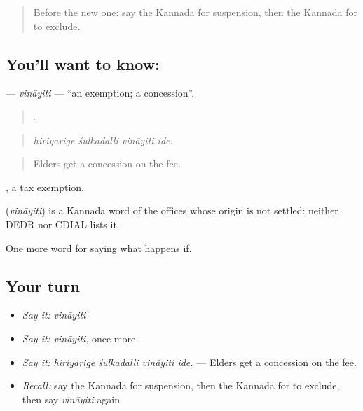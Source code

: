 \label{lesson:KA-C415-vinayiti}



\begin{quote}
Before the new one: say the Kannada for suspension, then the Kannada for to exclude.
\end{quote}

\subsection*{You'll want to know: }
\textbf{} — \emph{vināyiti} — \textquotedblleft{}an exemption; a concession\textquotedblright{}.

\begin{quote}
   .
\end{quote}

\begin{quote}
\emph{hiriyarige śulkadalli vināyiti ide.}
\end{quote}

\begin{quote}
Elders get a concession on the fee.
\end{quote}

 , a tax exemption.

\begin{cousinweb}
\textbf{} (\emph{vināyiti}) is a Kannada word of the offices whose origin is not settled: neither DEDR nor CDIAL lists it.
\end{cousinweb}

\begin{grammarlens}[title={What you've built}]
One more word for saying what happens if.
\end{grammarlens}

\subsection*{Your turn}
\begin{itemize}
\raggedright
  \item \emph{Say it:} \emph{vināyiti}
  \item \emph{Say it:} \emph{vināyiti}, once more
  \item \emph{Say it:} \emph{hiriyarige śulkadalli vināyiti ide.} — Elders get a concession on the fee.
  \item \emph{Recall:} say the Kannada for suspension, then the Kannada for to exclude, then say \emph{vināyiti} again
\end{itemize}

